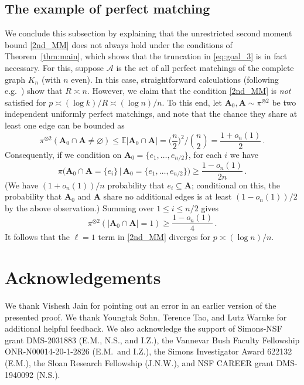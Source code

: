 \documentclass[11pt,reqno]{amsart}
\theoremstyle{plain}
\theoremstyle{definition}
\theoremstyle{remark}
\newcommand{\E}{\mathbb{E}}
\newcommand{\bA}{\mathbf{A}}
\renewcommand{\emptyset}{\varnothing}
\begin{document}
\subsection{The example of perfect matching}

We conclude this subsection by explaining that the unrestricted second moment bound \eqref{2nd_MM} does not always hold under the conditions of Theorem~\ref{thm:main}, which shows that the truncation in \eqref{eq:goal_3} is in fact necessary. For this, suppose $\mathscr{A}$ is the set of all perfect matchings of the complete graph $K_n$ (with $n$ even). In this case, straightforward calculations (following e.g.\ \cite[\S7, eq.~(28)]{fracKK_annals}) show that $R \asymp n$. However, we claim that the condition \eqref{2nd_MM} is \emph{not} satisfied for $p \asymp (\log k)/R  \asymp (\log n)/n$.  To this end, let $\bA_0,\bA\sim\pi^{\otimes2}$ be two independent uniformly perfect matchings, and note that the chance they share at least one edge can be bounded as
	\[
	\pi^{\otimes2}(\bA_0\cap\bA \ne \emptyset)
	\le \E|\bA_0\cap\bA|
	=\bigg( \frac{n}{2}\bigg)^2 \bigg/ \binom{n}{2}
	= \frac{1+o_n(1)}2\,.
	\]
Consequently, if we condition on $\bA_0=\{e_1,\ldots,e_{n/2}\}$, for each $i$ we have
	\[
	\pi\Big (\bA_0\cap\bA = \{e_i\} \,\Big|\, 
	\bA_0=\{e_1,\ldots,e_{n/2}\}\Big)
	\ge \frac{1-o_n(1)}{2n}\,.
	\]
(We have $(1+o_n(1))/n$ probability that $e_i\subseteq\bA$;
conditional on this, the probability that $\bA_0$ and $\bA$ share no additional edges is at least $(1-o_n(1))/2$ by the above observation.) Summing over $1\le i\le n/2$ gives
	\[
	\pi^{\otimes2}(|\bA_0\cap\bA|=1)\ge \frac{1-o_n(1)}{4}\,.
	\]
 It follows that the $\ell=1$ term in \eqref{2nd_MM}  diverges for $p\asymp (\log n)/n$. 

\section*{Acknowledgements} We thank Vishesh Jain for pointing out an error in an earlier version of the presented proof. We thank Youngtak Sohn, Terence Tao, and Lutz Warnke for additional helpful feedback. We also acknowledge the support of Simons-NSF grant DMS-2031883 (E.M., N.S., and I.Z.), the Vannevar Bush Faculty Fellowship ONR-N00014-20-1-2826 (E.M.\ and I.Z.), the Simons Investigator Award 622132 (E.M.), the Sloan Research Fellowship (J.N.W.), and NSF CAREER grant DMS-1940092 (N.S.).

 
\pagebreak

{\raggedright 


}
\end{document}
